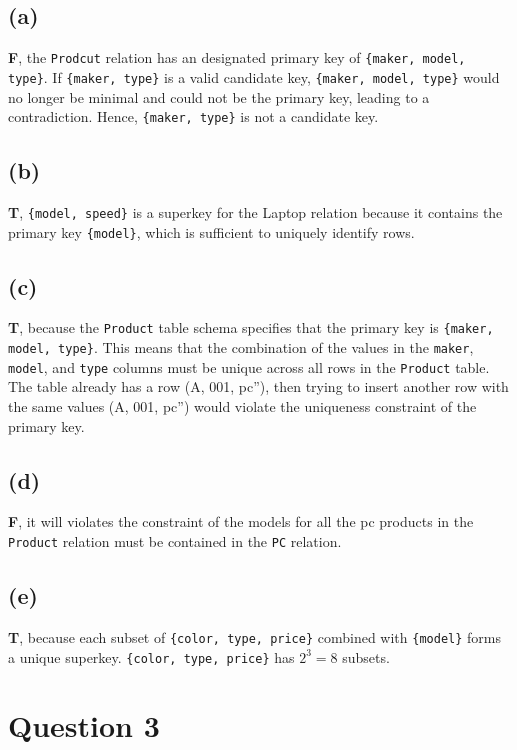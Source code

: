 \documentclass{article}
\begin{document}
\subsection*{(a)}
\textbf{F}, the \texttt{Prodcut} relation has an designated primary key of \texttt{\{maker, model, type\}}. If \texttt{\{maker, type\}} is a valid candidate key, \texttt{\{maker, model, type\}} would no longer be minimal and could not be the primary key, leading to a contradiction. Hence, \texttt{\{maker, type\}} is not a candidate key.

\subsection*{(b)}
\textbf{T}, \texttt{\{model, speed\}} is a superkey for the Laptop relation because it contains the primary key \texttt{\{model\}}, which is sufficient to uniquely identify rows.

\subsection*{(c)}
\textbf{T}, because the \texttt{Product} table schema specifies that the primary key is \texttt{\{maker, model, type\}}. This means that the combination of the values in the \texttt{maker}, \texttt{model}, and \texttt{type} columns must be unique across all rows in the \texttt{Product} table. The table already has a row (A, 001, pc''), then trying to insert another row with the same values (A, 001, pc'') would violate the uniqueness constraint of the primary key.

\subsection*{(d)}
\textbf{F}, it will violates the constraint of the models for all the pc products in the \texttt{Product} relation must be contained in the \texttt{PC} relation.

\subsection*{(e)}
\textbf{T}, because each subset of \texttt{\{color, type, price\}} combined with \texttt{\{model\}} forms a unique superkey. \texttt{\{color, type, price\}} has $2^3=8$ subsets.

\newpage
\section*{Question 3}
\end{document}
